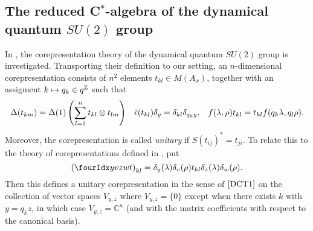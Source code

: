 




\subsection{The reduced C$^*$-algebra of the dynamical quantum $SU(2)$ group}



In \cite{KoR1}, the corepresentation theory of the dynamical quantum $SU(2)$ group is investigated. Transporting their definition to our setting, an $n$-dimensional corepresentation consists of $n^2$ elements $t_{kl} \in M(A_x)$, together with an assigment $k \mapsto q_k \in q^{\mathbb{Z}}$ such that \begin{align*} \Delta(t_{km}) = \Delta(1)\left(\sum_{l=1}^n t_{kl}\otimes t_{lm}\right)&& \operatorname{\tilde{\epsilon}}(t_{kl})\delta_y = \delta_{kl} \delta_{q_ky},&& f(\lambda,\rho)t_{kl} = t_{kl}f(q_k\lambda,q_l\rho).\end{align*} Moreover, the corepresentation is called \emph{unitary} if $S(t_{ij})^* =t_{ji}$. To relate this to the theory of corepresentations defined in \cite{DCT1}, put \[\left(\Gr{t}{y}{z}{v}{w}\right)_{kl} = \delta_{y}(\lambda)\delta_v(\rho) t_{kl} \delta_{z}(\lambda)\delta_{w}(\rho).\] Then this defines a unitary corepresentation in the sense of $\cite{DCT1}$ on the collection of vector spaces $V_{y,z}$ where $V_{y,z}=\{0\}$ except when there exists $k$ with $y = q_kz$,  in which case $V_{y,z} = \mathbb{C}^n$ (and with the matrix coefficients with respect to the canonical basis). 

